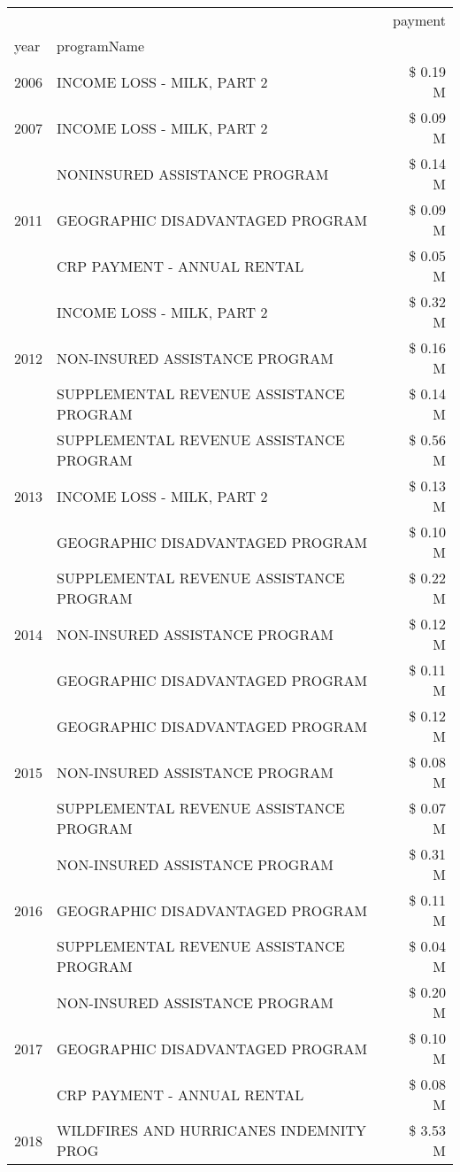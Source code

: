 \begin{tabular}{llr}
\toprule
 &  & payment \\
year & programName &  \\
\midrule
2006 & INCOME LOSS - MILK, PART 2 & \$ 0.19 M \\
\cline{1-3}
2007 & INCOME LOSS - MILK, PART 2 & \$ 0.09 M \\
\cline{1-3}
\multirow[t]{3}{*}{2011} & NONINSURED ASSISTANCE PROGRAM & \$ 0.14 M \\
 & GEOGRAPHIC DISADVANTAGED PROGRAM & \$ 0.09 M \\
 & CRP PAYMENT - ANNUAL RENTAL & \$ 0.05 M \\
\cline{1-3}
\multirow[t]{3}{*}{2012} & INCOME LOSS - MILK, PART 2 & \$ 0.32 M \\
 & NON-INSURED ASSISTANCE PROGRAM & \$ 0.16 M \\
 & SUPPLEMENTAL REVENUE ASSISTANCE PROGRAM & \$ 0.14 M \\
\cline{1-3}
\multirow[t]{3}{*}{2013} & SUPPLEMENTAL REVENUE ASSISTANCE PROGRAM & \$ 0.56 M \\
 & INCOME LOSS - MILK, PART 2 & \$ 0.13 M \\
 & GEOGRAPHIC DISADVANTAGED PROGRAM & \$ 0.10 M \\
\cline{1-3}
\multirow[t]{3}{*}{2014} & SUPPLEMENTAL REVENUE ASSISTANCE PROGRAM & \$ 0.22 M \\
 & NON-INSURED ASSISTANCE PROGRAM & \$ 0.12 M \\
 & GEOGRAPHIC DISADVANTAGED PROGRAM & \$ 0.11 M \\
\cline{1-3}
\multirow[t]{3}{*}{2015} & GEOGRAPHIC DISADVANTAGED PROGRAM & \$ 0.12 M \\
 & NON-INSURED ASSISTANCE PROGRAM & \$ 0.08 M \\
 & SUPPLEMENTAL REVENUE ASSISTANCE PROGRAM & \$ 0.07 M \\
\cline{1-3}
\multirow[t]{3}{*}{2016} & NON-INSURED ASSISTANCE PROGRAM & \$ 0.31 M \\
 & GEOGRAPHIC DISADVANTAGED PROGRAM & \$ 0.11 M \\
 & SUPPLEMENTAL REVENUE ASSISTANCE PROGRAM & \$ 0.04 M \\
\cline{1-3}
\multirow[t]{3}{*}{2017} & NON-INSURED ASSISTANCE PROGRAM & \$ 0.20 M \\
 & GEOGRAPHIC DISADVANTAGED PROGRAM & \$ 0.10 M \\
 & CRP PAYMENT - ANNUAL RENTAL & \$ 0.08 M \\
\cline{1-3}
\multirow[t]{3}{*}{2018} & WILDFIRES AND HURRICANES INDEMNITY PROG & \$ 3.53 M \\

\end{tabular}
